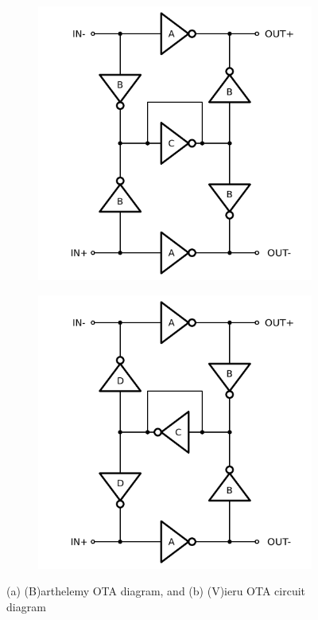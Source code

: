 \documentclass[conference]{IEEEtran}
\begin{document}
\begin{figure}[htbp]
	\centering
	\begin{subfigure}[b]{0.45\columnwidth}
		\centerline{\includegraphics[scale=0.50]{circuits/barth.pdf}}
		\caption{}
		\label{fig:barth:sch}
	\end{subfigure}
	\begin{subfigure}[b]{0.45\columnwidth}
		\centerline{\includegraphics[scale=0.50]{circuits/vieru.pdf}}
		\caption{}
		\label{fig:vieru:sch}
	\end{subfigure}
	\caption{(a) (B)arthelemy OTA diagram\cite{barthelemy2008ota}, and (b) (V)ieru OTA circuit diagram \cite{vieru2012ultra}}
\end{figure}
\end{document}
